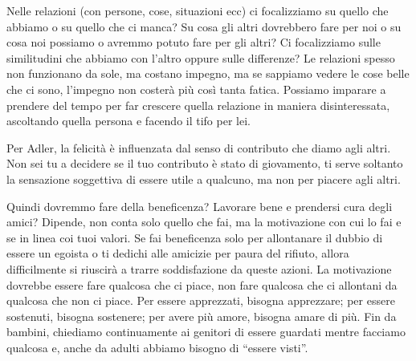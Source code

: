 \documentclass[12pt]{book} %
\begin{document}
Nelle relazioni (con persone, cose, situazioni ecc) ci focalizziamo su quello che abbiamo o su quello che ci manca? Su cosa gli altri
dovrebbero fare per noi o su cosa noi possiamo o avremmo potuto fare per gli altri?
Ci focalizziamo sulle similitudini che abbiamo con l'altro oppure sulle differenze? Le relazioni spesso non funzionano
da sole, ma costano impegno, ma se sappiamo vedere le cose belle che ci sono,
l'impegno non costerà più così tanta fatica. Possiamo imparare a prendere del tempo per far crescere
quella relazione in maniera disinteressata, ascoltando quella persona e facendo il tifo per lei.

Per Adler, la felicità è influenzata dal senso di contributo che diamo agli altri. Non sei tu a decidere se il tuo contributo
è stato di giovamento, ti serve soltanto la sensazione soggettiva di essere utile a qualcuno, ma non per piacere agli
altri.

Quindi dovremmo fare della beneficenza? Lavorare bene e prendersi cura degli amici? Dipende, non conta solo quello che
fai, ma la motivazione con cui lo fai e se in linea coi tuoi valori. Se fai beneficenza solo per allontanare il
dubbio di essere un egoista o ti dedichi alle amicizie per paura del rifiuto, allora difficilmente si riuscirà a trarre
soddisfazione da queste azioni. La motivazione dovrebbe essere fare qualcosa che ci piace, non fare qualcosa che ci
allontani da qualcosa che non ci piace. Per essere apprezzati, bisogna apprezzare; per essere sostenuti, bisogna
sostenere; per avere più amore, bisogna amare di più. Fin da bambini, chiediamo continuamente ai genitori di essere
guardati mentre facciamo qualcosa e, anche da adulti abbiamo bisogno di “essere visti”. 
\end{document}
